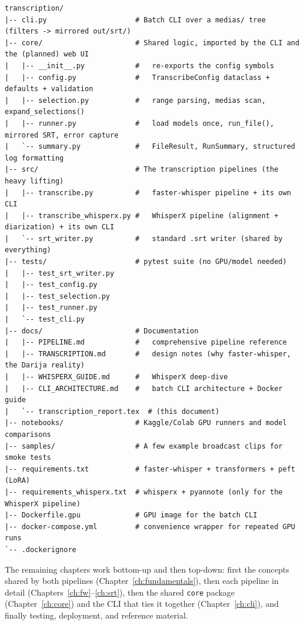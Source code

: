 \documentclass[11pt,a4paper]{report}
\begin{document}
\begin{lstlisting}[style=sh,numbers=none,caption={Annotated repository tree.}]
transcription/
|-- cli.py                     # Batch CLI over a medias/ tree (filters -> mirrored out/srt/)
|-- core/                      # Shared logic, imported by the CLI and the (planned) web UI
|   |-- __init__.py            #   re-exports the config symbols
|   |-- config.py              #   TranscribeConfig dataclass + defaults + validation
|   |-- selection.py           #   range parsing, medias scan, expand_selections()
|   |-- runner.py              #   load models once, run_file(), mirrored SRT, error capture
|   `-- summary.py             #   FileResult, RunSummary, structured log formatting
|-- src/                       # The transcription pipelines (the heavy lifting)
|   |-- transcribe.py          #   faster-whisper pipeline + its own CLI
|   |-- transcribe_whisperx.py #   WhisperX pipeline (alignment + diarization) + its own CLI
|   `-- srt_writer.py          #   standard .srt writer (shared by everything)
|-- tests/                     # pytest suite (no GPU/model needed)
|   |-- test_srt_writer.py
|   |-- test_config.py
|   |-- test_selection.py
|   |-- test_runner.py
|   `-- test_cli.py
|-- docs/                      # Documentation
|   |-- PIPELINE.md            #   comprehensive pipeline reference
|   |-- TRANSCRIPTION.md       #   design notes (why faster-whisper, the Darija reality)
|   |-- WHISPERX_GUIDE.md      #   WhisperX deep-dive
|   |-- CLI_ARCHITECTURE.md    #   batch CLI architecture + Docker guide
|   `-- transcription_report.tex  # (this document)
|-- notebooks/                 # Kaggle/Colab GPU runners and model comparisons
|-- samples/                   # A few example broadcast clips for smoke tests
|-- requirements.txt           # faster-whisper + transformers + peft (LoRA)
|-- requirements_whisperx.txt  # whisperx + pyannote (only for the WhisperX pipeline)
|-- Dockerfile.gpu             # GPU image for the batch CLI
|-- docker-compose.yml         # convenience wrapper for repeated GPU runs
`-- .dockerignore
\end{lstlisting}

\noindent
The remaining chapters work bottom-up and then top-down: first the concepts shared
by both pipelines (Chapter~\ref{ch:fundamentals}), then each pipeline in detail
(Chapters~\ref{ch:fw}--\ref{ch:srt}), then the shared \texttt{core} package
(Chapter~\ref{ch:core}) and the CLI that ties it together
(Chapter~\ref{ch:cli}), and finally testing, deployment, and reference material.
\end{document}
